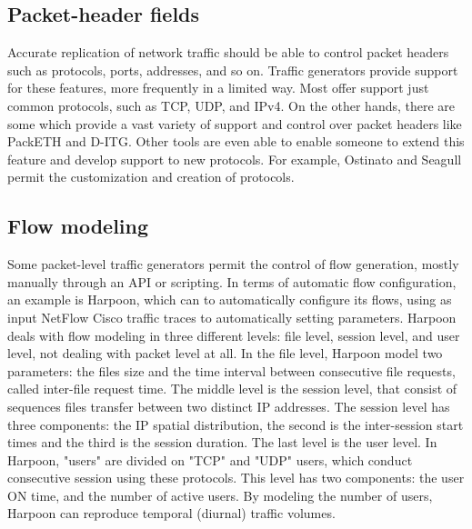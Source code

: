 \subsection{Packet-header fields}

Accurate replication of network traffic should be able to control packet headers such as protocols, ports, addresses, and so on. Traffic generators provide support for these features, more frequently in a limited way. Most offer support just common protocols, such as TCP, UDP, and \acrfull{IPv4}. On the other hands, there are some which provide a vast variety of support and control over packet headers like PackETH\cite{web-packeth} and D-ITG\cite{web-ditg}. Other tools are even able to enable someone to extend this feature and develop support to new protocols. For example, Ostinato and Seagull permit the customization and creation of protocols\cite{wp-seagull}.


\subsection{Flow modeling}

Some packet-level traffic generators permit the control of flow generation, mostly manually through an API or scripting. In terms of automatic flow configuration, an example is Harpoon\cite{harpoon-paper}, which can to automatically configure its flows, using as input NetFlow Cisco traffic traces to automatically setting parameters. Harpoon deals with flow modeling in three different levels: file level, session level, and user level, not dealing with packet level at all. In the file level, Harpoon model two parameters: the files size and the time interval between consecutive file requests, called inter-file request time. The middle level is the session level, that consist of sequences files transfer between two distinct \acrfull{IP} addresses. The session level has three components: the IP spatial distribution, the second is the inter-session start times and the third is the session duration. The last level is the user level. In Harpoon, "users" are divided on "TCP" and "UDP" users, which conduct consecutive session using these protocols. This level has two components: the user ON time, and the number of active users. By modeling the number of users, Harpoon can reproduce temporal (diurnal) traffic volumes.


